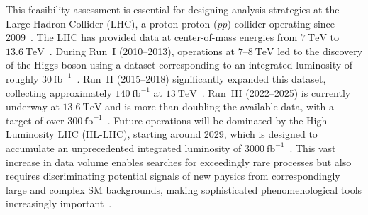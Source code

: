 This feasibility assessment is essential for designing analysis strategies at the Large Hadron Collider (LHC), a proton-proton ($pp$) collider operating since 2009~\cite{Evans_2008,ATLAS:2008xda,CMS:2008xjf}. The LHC has provided data at center-of-mass energies from $7~\mathrm{TeV}$ to $13.6~\mathrm{TeV}$~\cite{CMS:2021ctt,lumiRef}. During Run~I (2010–2013), operations at $7$–$8~\mathrm{TeV}$ led to the discovery of the Higgs boson using a dataset corresponding to an integrated luminosity of roughly $30~\mathrm{fb}^{-1}$~\cite{ATLAS:2012yve,CMS:2012gu}. Run~II (2015–2018) significantly expanded this dataset, collecting approximately $140~\mathrm{fb}^{-1}$ at $13~\mathrm{TeV}$~\cite{lumiRef,CMS:2021ctt}. Run~III (2022–2025) is currently underway at $13.6~\mathrm{TeV}$ and is more than doubling the available data, with a target of over $300~\mathrm{fb}^{-1}$~\cite{lumiRef}. Future operations will be dominated by the High-Luminosity LHC (HL-LHC), starting around 2029, which is designed to accumulate an unprecedented integrated luminosity of $3000~\mathrm{fb}^{-1}$~\cite{CMS-PAS-FTR-13-014,Apollinari2017_HLLHC}. This vast increase in data volume enables searches for exceedingly rare processes but also requires discriminating potential signals of new physics from correspondingly large and complex SM backgrounds, making sophisticated phenomenological tools increasingly important~\cite{Alwall:2014hca,deFavereau:2013fsa}.


 
 
 
 
 
